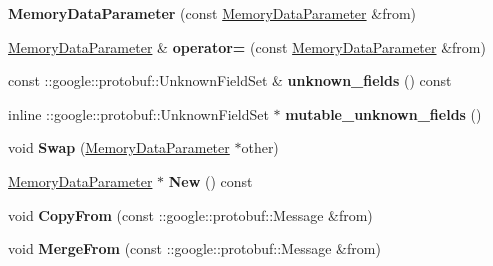 \begin{DoxyCompactItemize}
{\bfseries Memory\+Data\+Parameter} (const \mbox{\hyperlink{classcaffe_1_1_memory_data_parameter}{Memory\+Data\+Parameter}} \&from)
\item 
\mbox{\label{classcaffe_1_1_memory_data_parameter_ab73fc420f9924fdb5ba36d8e9507eb71}} 
\mbox{\hyperlink{classcaffe_1_1_memory_data_parameter}{Memory\+Data\+Parameter}} \& {\bfseries operator=} (const \mbox{\hyperlink{classcaffe_1_1_memory_data_parameter}{Memory\+Data\+Parameter}} \&from)
\item 
\mbox{\label{classcaffe_1_1_memory_data_parameter_a3bc4d58e8a43c01d25a28bb91d2c89ce}} 
const \+::google\+::protobuf\+::\+Unknown\+Field\+Set \& {\bfseries unknown\+\_\+fields} () const
\item 
\mbox{\label{classcaffe_1_1_memory_data_parameter_ad93fbe909d8506248c5fbe998f4538e3}} 
inline \+::google\+::protobuf\+::\+Unknown\+Field\+Set $\ast$ {\bfseries mutable\+\_\+unknown\+\_\+fields} ()
\item 
\mbox{\label{classcaffe_1_1_memory_data_parameter_a6fb29a205a4e7f144389d4e6ffa4d98d}} 
void {\bfseries Swap} (\mbox{\hyperlink{classcaffe_1_1_memory_data_parameter}{Memory\+Data\+Parameter}} $\ast$other)
\item 
\mbox{\label{classcaffe_1_1_memory_data_parameter_a2b698be7eb8a284e37cddb3e7397d54a}} 
\mbox{\hyperlink{classcaffe_1_1_memory_data_parameter}{Memory\+Data\+Parameter}} $\ast$ {\bfseries New} () const
\item 
\mbox{\label{classcaffe_1_1_memory_data_parameter_a04ea2d77f7368b632ca8a2b3c42c4f57}} 
void {\bfseries Copy\+From} (const \+::google\+::protobuf\+::\+Message \&from)
\item 
\mbox{\label{classcaffe_1_1_memory_data_parameter_a74afd6f394f2471ff763a4633082220a}} 
void {\bfseries Merge\+From} (const \+::google\+::protobuf\+::\+Message \&from)
\item 
\mbox{\label{classcaffe_1_1_memory_data_parameter_aab3bd574e957cdbfe0e7288d0f29cd56}} 

\end{DoxyCompactItemize}
